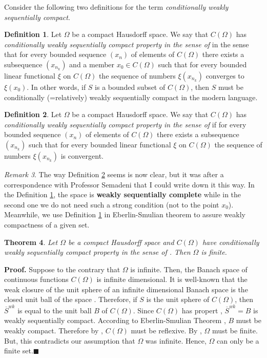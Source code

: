 \documentclass[11pt,bezier,epsf]{amsart}
\newtheorem{thm}{Theorem}[section]
\theoremstyle{definition}
\newtheorem{defn}[thm]{Definition}
\theoremstyle{remark}
\newtheorem{rem}[thm]{Remark}
\numberwithin{equation}{section}
\begin{document}
Consider the following two definitions for the term {\it conditionally weakly
sequentially compact}.

\begin{defn} \label{ES}
Let $\varOmega$ be a compact Hausdorff space. We say that $C(\varOmega)$ has
{\it conditionally weakly sequentially compact property in the sense of} in the sense that for every
bounded sequence $(x_n)$ of elements of $C(\varOmega)$ there exists a subsequence $(x_{n_{k}})$ and a member $ x_0 \in C(\varOmega)$ such that for every bounded linear functional $\xi$ on
$C(\varOmega)$ the sequence of numbers $\xi(x_{n_{k}})$ converges to $\xi(x_0)$. In other words, if $S$ is a bounded subset of $C(\varOmega)$, then $S$ must be conditionally (=relatively) weakly sequentially compact in the modern language. 
\end{defn}

\begin{defn} \label{PS}
Let $\varOmega$ be a compact Hausdorff space. We say that $C(\varOmega)$ has
{\it conditionally weakly sequentially compact property in the sense of} if for every
bounded sequence $(x_n)$ of elements of $C(\varOmega)$ there exists a subsequence $(x_{n_{k}})$ such that for every bounded linear functional $\xi$ on
$C(\varOmega)$ the sequence of numbers $\xi(x_{n_{k}})$ is convergent.
\end{defn}
\begin{rem}
The way Definition \ref{PS} seems is now clear, but it was after a correspondence with Professor Semadeni that I could write down it this way. In the Definition \ref{ES}, the space is {\bf weakly sequentially complete} while in the second one we do not need such a strong condition (not to the point $x_0$). Meanwhile, we use Definition \ref{ES} in Eberlin-Smulian theorem to assure weakly compactness of a given set.
\end{rem}


\begin{thm} \label{scatter}
	Let $\varOmega$ be a compact Hausdorff space and $C(\varOmega)$ have conditionally weakly sequentially compact property in the sense of . Then $\varOmega$ is finite.
\end{thm}
{\bf Proof.} Suppose to the contrary that $\varOmega$ is infinite. Then, the
Banach space of continuous functions $C(\varOmega)$ is infinite dimensional. It
is well-known that the weak closure of the unit sphere of an infinite
dimensional Banach space is the closed unit ball of the space
\cite[p.128]{Conway}. Therefore, if $S$ is the unit sphere of $C(\varOmega)$,
then ${\overline{S}}^{wk}$ is equal to the unit ball $B$ of $C(\varOmega)$.
Since $C(\varOmega)$ has propert , ${\overline{S}}^{wk}=B$ is weakly
sequentially compact. According to Eberlin-Smulian Theorem \cite[p.163]{Conway},
$B$ must be weakly compact. Therefore by \cite[Theorem 4.2, p.132]{Conway},
$C(\varOmega)$ must be reflexive. By \cite[p.90]{Conway}, $\varOmega$ must be
finite. But, this contradicts our assumption that $\varOmega$ was infinite.
Hence, $\varOmega$ can only be a finite set.$\blacksquare$
\end{document}
